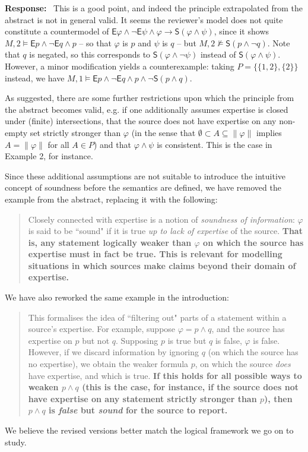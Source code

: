 \documentclass[12pt]{article}
\newenvironment{response}{
    \noindent\textbf{Response:}\
}{\vspace{5mm}}
\renewcommand{\phi}{\varphi}
\newcommand{\E}{\mathsf{E}}
\renewcommand{\S}{\mathsf{S}}
\begin{document}
\begin{response}
    This is a good point, and indeed the principle extrapolated from the
    abstract is not in general valid. It seems the reviewer's model does not
    quite constitute a countermodel of $\E\phi \land \neg\E\psi \land \phi
    \rightarrow \S(\phi \land \psi)$, since it shows $M, 2 \models \E{p} \land
    \neg\E{q} \land p$ -- so that $\phi$ is $p$ and $\psi$ is $q$ -- but $M, 2
    \not\models \S(p \land \neg{q})$. Note that $q$ is negated, so this
    corresponds to $\S(\phi \land \neg\psi)$ instead of $\S(\phi \land \psi)$.
    However, a minor modification yields a counterexample: taking $P = \{\{1,
    2\}, \{2\}\}$ instead, we have $M, 1 \models \E{p} \land \neg\E{q} \land p
    \land \neg\S(p \land q)$.

    As suggested, there are some further restrictions upon which the principle
    from the abstract becomes valid, e.g. if one additionally assumes expertise
    is closed under (finite) intersections, that the source does not have
    expertise on any non-empty set strictly stronger than $\phi$ (in the sense
    that $\emptyset \subset A \subseteq \|\phi\|$ implies $A = \|\phi\|$ for
    all $A \in P$) and that $\phi \land \psi$ is consistent. This is the case
    in Example 2, for instance.

    Since these additional assumptions are not suitable to introduce the
    intuitive concept of soundness before the semantics are defined, we have
    removed the example from the abstract, replacing it with the following:

    \begin{quotation}
        Closely connected with expertise is a notion of \emph{soundness of
        information}: $\phi$ is said to be ``sound" if it is true \emph{up to
        lack of expertise} of the source. \textbf{That is, any statement
        logically weaker than $\phi$ on which the source has expertise must in
        fact be true. This is relevant for modelling situations in which
        sources make claims beyond their domain of expertise.}
    \end{quotation}

    We have also reworked the same example in the introduction:

    \begin{quotation}
        This formalises the idea of ``filtering out" parts of a statement
        within a source's expertise. For example, suppose $\phi = p \land q$,
        and the source has expertise on $p$ but not $q$. Supposing $p$ is true
        but $q$ is false, $\phi$ is false. However, if we discard information
        by ignoring $q$ (on which the source has no expertise), we obtain the
        weaker formula $p$, on which the source \emph{does} have expertise, and
        which is true. \textbf{If this holds for all possible ways to weaken $p
        \land q$ (this is the case, for instance, if the source does not have
        expertise on any statement strictly stronger than $p$), then $p \land
        q$ is \emph{false} but \emph{sound} for the source to report.}
    \end{quotation}

    We believe the revised versions better match the logical framework we go on
    to study.
\end{response}
\end{document}
